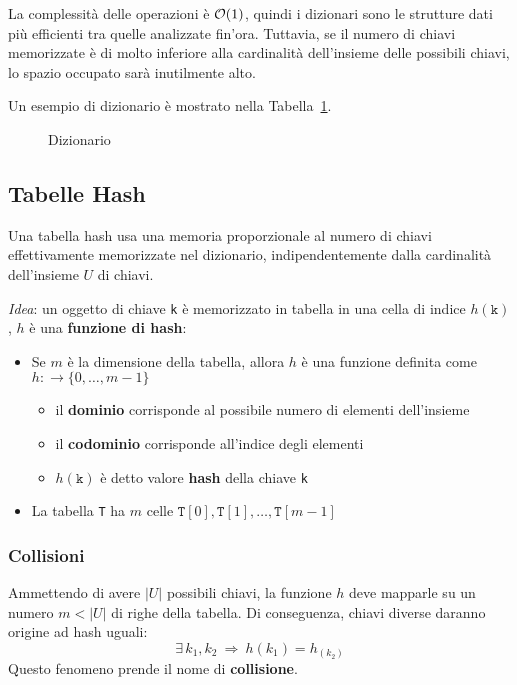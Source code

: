 \documentclass[italian, 10pt]{article}
\begin{document}
La complessità delle operazioni è \(\mathcal{O}(1)\), quindi i dizionari sono le strutture dati più efficienti tra quelle analizzate fin'ora.
Tuttavia, se il numero di chiavi memorizzate è di molto inferiore alla cardinalità dell'insieme delle possibili chiavi, lo spazio occupato sarà inutilmente alto.

\bigskip
Un esempio di dizionario è mostrato nella Tabella~\ref{fig:dizionario}.

\begin{figure}[htbp]
  \bigskip
  \centering
  \caption{Dizionario}
  \label{fig:dizionario}
  \bigskip
\end{figure}

\subsection{Tabelle Hash}

Una tabella hash usa una memoria proporzionale al numero di chiavi effettivamente memorizzate nel dizionario, indipendentemente dalla cardinalità dell'insieme \(U\) di chiavi.

\textit{Idea}: un oggetto di chiave \texttt{k} è memorizzato in tabella in una cella di indice \(h(\texttt{k})\), \(h\) è una \textbf{funzione di hash}:

\begin{itemize}
  \item Se \(m\) è la dimensione della tabella, allora \(h\) è una funzione definita come \(h: \rightarrow \{0, \ldots, m-1\}\)
        \begin{itemize}
          \item il \textbf{dominio} corrisponde al possibile numero di elementi dell'insieme
          \item il \textbf{codominio} corrisponde all'indice degli elementi
          \item \(h(\texttt{k})\) è detto valore \textbf{hash} della chiave \texttt{k}
        \end{itemize}
  \item La tabella \texttt{T} ha \(m\) celle \(\texttt{T}[0], \texttt{T}[1], \ldots, \texttt{T}[m-1]\)
\end{itemize}

\subsubsection{Collisioni}

Ammettendo di avere \(|U|\) possibili chiavi, la funzione \(h\) deve mapparle su un numero \(m < |U|\) di righe della tabella.
Di conseguenza, chiavi diverse daranno origine ad hash uguali:
\[\exists \, k_1, k_2 \ \Rightarrow \ h(k_1) = h_(k_2) \]
Questo fenomeno prende il nome di \textbf{collisione}.
\end{document}
